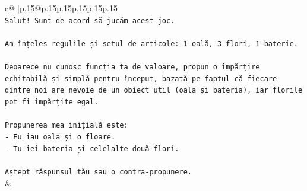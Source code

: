 \documentclass{article}
\begin{document}
{\begin{supertabular}{c@{$\;$}|p{.15\linewidth}@{}p{.15\linewidth}p{.15\linewidth}p{.15\linewidth}p{.15\linewidth}p{.15\linewidth}}
{{{\\ 
\texttt{Salut! Sunt de acord să jucăm acest joc.} \\
\\ 
\texttt{Am înțeles regulile și setul de articole: 1 oală, 3 flori, 1 baterie.} \\
\\ 
\texttt{Deoarece nu cunosc funcția ta de valoare, propun o împărțire echitabilă și simplă pentru început, bazată pe faptul că fiecare dintre noi are nevoie de un obiect util (oala și bateria), iar florile pot fi împărțite egal.} \\
\\ 
\texttt{Propunerea mea inițială este:} \\
\texttt{{-} Eu iau oala și o floare.} \\
\texttt{{-} Tu iei bateria și celelalte două flori.} \\
\\ 
\texttt{Aștept răspunsul tău sau o contra{-}propunere.} \\
            }
        }
    }
    & \\ \\


\end{supertabular}}
\end{document}
